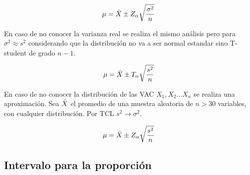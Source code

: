 \begin{mdframed}[style=DefinitionFrame]
    \begin{defn}
    \end{defn}
    \begin{equation*}
        \mu = \bar{X} \pm Z_\alpha \sqrt{\frac{\sigma^2}{n}}
    \end{equation*}
\end{mdframed}

En caso de no conocer la varianza real se realiza el mismo análisis pero para $\sigma^2 \approx s^2$ considerando que la distribución no va a ser normal estandar sino T-student de grado $n-1$.

\begin{mdframed}[style=DefinitionFrame]
    \begin{defn}
    \end{defn}
    \begin{equation*}
        \mu = \bar{X} \pm T_\alpha \sqrt{\frac{s^2}{n}}
    \end{equation*}
\end{mdframed}

En caso de no conocer la distribución de las VAC $X_1, X_2 \dots X_n$ se realiza una aproximación.
Sea $\bar{X}$ el promedio de una muestra aleatoria de $n>30$ variables, con cualquier distribución.
Por TCL $s^2 \to \sigma^2$.

\begin{mdframed}[style=DefinitionFrame]
    \begin{defn}
    \end{defn}
    \begin{equation*}
        \mu = \bar{X} \pm Z_\alpha \sqrt{\frac{s^2}{n}}
    \end{equation*}
\end{mdframed}


\subsection{Intervalo para la proporción}

